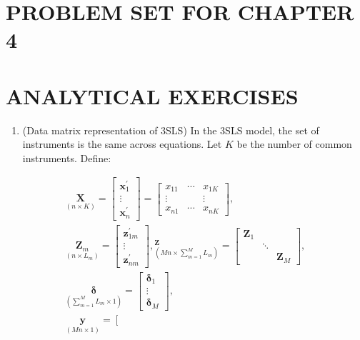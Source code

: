 \documentclass[10pt]{article}
\begin{document}
\section*{PROBLEM SET FOR CHAPTER 4}
\section*{ANALYTICAL EXERCISES}
\begin{enumerate}
  \item (Data matrix representation of 3SLS) In the 3SLS model, the set of instruments is the same across equations. Let $K$ be the number of common instruments. Define:
\end{enumerate}

$$
\begin{gathered}
\underset{(n \times K)}{\mathbf{X}}=\left[\begin{array}{c}
\mathbf{x}_{1}^{\prime} \\
\vdots \\
\mathbf{x}_{n}^{\prime}
\end{array}\right]=\left[\begin{array}{ccc}
x_{11} & \cdots & x_{1 K} \\
\vdots & & \vdots \\
x_{n 1} & \cdots & x_{n K}
\end{array}\right], \\
\underset{\left(n \times L_{m}\right)}{\mathbf{Z}_{m}}=\left[\begin{array}{c}
\mathbf{z}_{1 m}^{\prime} \\
\vdots \\
\mathbf{z}_{n m}^{\prime}
\end{array}\right],{ }_{\left(M n \times \sum_{m=1}^{M} L_{m}\right)}^{\mathbf{Z}}=\left[\begin{array}{lll}
\mathbf{Z}_{1} & & \\
& \ddots & \\
& & \mathbf{Z}_{M}
\end{array}\right], \\
\underset{\left(\sum_{m=1}^{M} L_{m} \times 1\right)}{\boldsymbol{\delta}}=\left[\begin{array}{c}
\boldsymbol{\delta}_{1} \\
\vdots \\
\boldsymbol{\delta}_{M}
\end{array}\right], \\
\underset{(M n \times 1)}{\mathbf{y}}=\left[\begin{array}{c}

\end{array}
\end{gathered}$$
\end{document}

